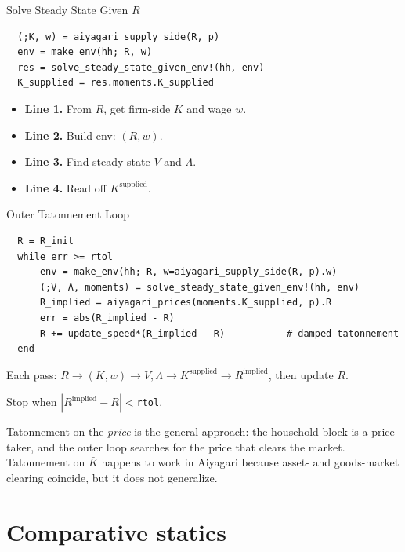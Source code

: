 \documentclass[10pt,aspectratio=169]{beamer}
\begin{document}
\begin{frame}[fragile]{Solve Steady State Given $R$}
  \begin{lstlisting}
  (;K, w) = aiyagari_supply_side(R, p)
  env = make_env(hh; R, w)
  res = solve_steady_state_given_env!(hh, env)
  K_supplied = res.moments.K_supplied
  \end{lstlisting}
  \begin{itemize}
    \item \textbf{Line 1.} From $R$, get firm-side $K$ and wage $w$.
    \item \textbf{Line 2.} Build env: $(R, w)$.
    \item \textbf{Line 3.} Find steady state $V$ and $\Lambda$.
    \item \textbf{Line 4.} Read off $K^{\mathrm{supplied}}$.
  \end{itemize}
\end{frame}

\begin{frame}[fragile]{Outer Tatonnement Loop}
  \begin{lstlisting}
  R = R_init
  while err >= rtol
      env = make_env(hh; R, w=aiyagari_supply_side(R, p).w)
      (;V, Λ, moments) = solve_steady_state_given_env!(hh, env)
      R_implied = aiyagari_prices(moments.K_supplied, p).R
      err = abs(R_implied - R)
      R += update_speed*(R_implied - R)           # damped tatonnement
  end
  \end{lstlisting}
  Each pass: $R \to (K, w) \to V,\Lambda \to K^{\mathrm{supplied}} \to R^{\mathrm{implied}}$, then update $R$.

  Stop when $|R^{\mathrm{implied}} - R| < $\texttt{rtol}.

  \vspace{0.4em}
  \footnotesize Tatonnement on the \emph{price} is the general approach: the household block is a price-taker, and the outer loop searches for the price that clears the market. Tatonnement on $\bar K$ happens to work in Aiyagari because asset- and goods-market clearing coincide, but it does not generalize.
\end{frame}

\section[Comparative statics]{Comparative statics}
\end{document}
